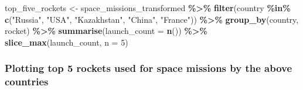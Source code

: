 \documentclass[
]{article}
\newenvironment{Shaded}{\begin{snugshade}}{\end{snugshade}}
\newcommand{\AttributeTok}[1]{\textcolor[rgb]{0.13,0.29,0.53}{#1}}
\newcommand{\DecValTok}[1]{\textcolor[rgb]{0.00,0.00,0.81}{#1}}
\newcommand{\FunctionTok}[1]{\textcolor[rgb]{0.13,0.29,0.53}{\textbf{#1}}}
\newcommand{\NormalTok}[1]{#1}
\newcommand{\OtherTok}[1]{\textcolor[rgb]{0.56,0.35,0.01}{#1}}
\newcommand{\SpecialCharTok}[1]{\textcolor[rgb]{0.81,0.36,0.00}{\textbf{#1}}}
\newcommand{\StringTok}[1]{\textcolor[rgb]{0.31,0.60,0.02}{#1}}
\begin{document}
\begin{Shaded}
\begin{Highlighting}[]
\NormalTok{top\_five\_rockets }\OtherTok{\textless{}{-}}\NormalTok{ space\_missions\_transformed }\SpecialCharTok{\%\textgreater{}\%}
  \FunctionTok{filter}\NormalTok{(country }\SpecialCharTok{\%in\%} \FunctionTok{c}\NormalTok{(}\StringTok{"Russia"}\NormalTok{, }\StringTok{"USA"}\NormalTok{, }\StringTok{"Kazakhstan"}\NormalTok{, }\StringTok{"China"}\NormalTok{, }\StringTok{"France"}\NormalTok{)) }\SpecialCharTok{\%\textgreater{}\%}
  \FunctionTok{group\_by}\NormalTok{(country, rocket) }\SpecialCharTok{\%\textgreater{}\%}
  \FunctionTok{summarise}\NormalTok{(}\AttributeTok{launch\_count =} \FunctionTok{n}\NormalTok{()) }\SpecialCharTok{\%\textgreater{}\%} 
  \FunctionTok{slice\_max}\NormalTok{(launch\_count, }\AttributeTok{n =} \DecValTok{5}\NormalTok{)}
\end{Highlighting}
\end{Shaded}

\hypertarget{plotting-top-5-rockets-used-for-space-missions-by-the-above-countries}{%
\subsubsection{Plotting top 5 rockets used for space missions by the
above
countries}\label{plotting-top-5-rockets-used-for-space-missions-by-the-above-countries}}
\end{document}
